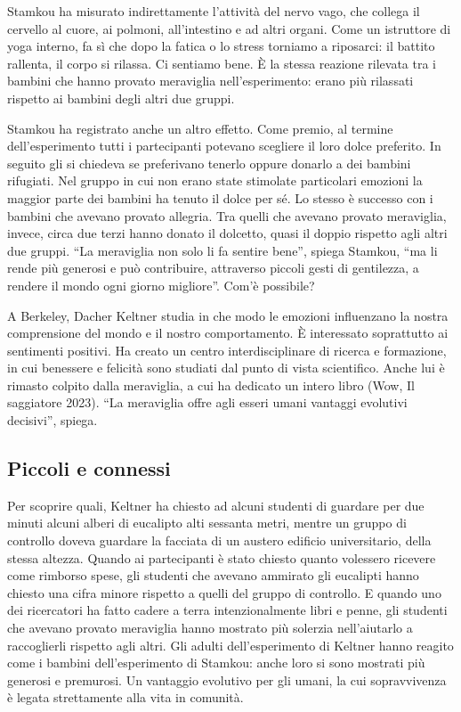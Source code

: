 \documentclass[11pt]{report}
\begin{document}
Stamkou ha misurato indirettamente l’attività del nervo vago, che collega il cervello al cuore, ai polmoni, all’intestino e ad altri organi. Come un istruttore di yoga interno, fa sì che dopo la fatica o lo stress torniamo a riposarci: il battito rallenta, il corpo si rilassa. Ci sentiamo bene. È la stessa reazione rilevata tra i bambini che hanno provato meraviglia nell’esperimento: erano più rilassati rispetto ai bambini degli altri due gruppi.

Stamkou ha registrato anche un altro effetto. Come premio, al termine dell’esperimento tutti i partecipanti potevano scegliere il loro dolce preferito. In seguito gli si chiedeva se preferivano tenerlo oppure donarlo a dei bambini rifugiati. Nel gruppo in cui non erano state stimolate particolari emozioni la maggior parte dei bambini ha tenuto il dolce per sé. Lo stesso è successo con i bambini che avevano provato allegria. Tra quelli che avevano provato meraviglia, invece, circa due terzi hanno donato il dolcetto, quasi il doppio rispetto agli altri due gruppi. “La meraviglia non solo li fa sentire bene”, spiega Stamkou, “ma li rende più generosi e può contribuire, attraverso piccoli gesti di gentilezza, a rendere il mondo ogni giorno migliore”. Com’è possibile?

A Berkeley, Dacher Keltner studia in che modo le emozioni influenzano la nostra comprensione del mondo e il nostro comportamento. È interessato soprattutto ai sentimenti positivi. Ha creato un centro interdisciplinare di ricerca e formazione, in cui benessere e felicità sono studiati dal punto di vista scientifico. Anche lui è rimasto colpito dalla meraviglia, a cui ha dedicato un intero libro (Wow, Il saggiatore 2023). “La meraviglia offre agli esseri umani vantaggi evolutivi decisivi”, spiega.


\subsection*{Piccoli e connessi}

Per scoprire quali, Keltner ha chiesto ad alcuni studenti di guardare per due minuti alcuni alberi di eucalipto alti sessanta metri, mentre un gruppo di controllo doveva guardare la facciata di un austero edificio universitario, della stessa altezza. Quando ai partecipanti è stato chiesto quanto volessero ricevere come rimborso spese, gli studenti che avevano ammirato gli eucalipti hanno chiesto una cifra minore rispetto a quelli del gruppo di controllo. E quando uno dei ricercatori ha fatto cadere a terra intenzionalmente libri e penne, gli studenti che avevano provato meraviglia hanno mostrato più solerzia nell’aiutarlo a raccoglierli rispetto agli altri. Gli adulti dell’esperimento di Keltner hanno reagito come i bambini dell’esperimento di Stamkou: anche loro si sono mostrati più generosi e premurosi. Un vantaggio evolutivo per gli umani, la cui sopravvivenza è legata strettamente alla vita in comunità.
\end{document}
